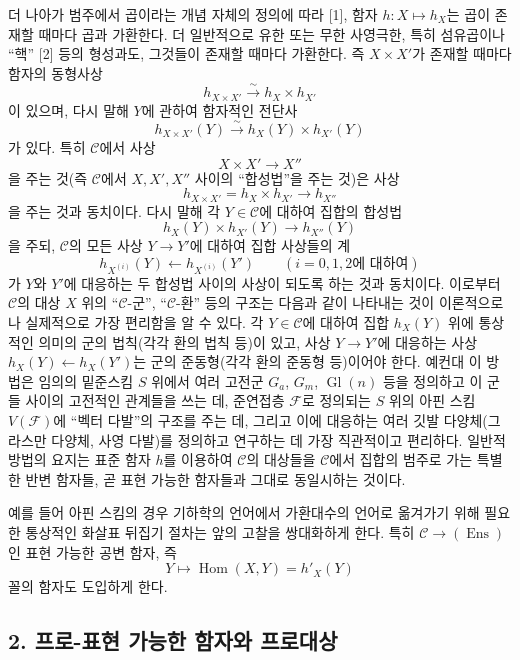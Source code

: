 더 나아가 범주에서 곱이라는 개념 자체의 정의에 따라 [1], 함자
$h:X\longmapsto h_X$는 곱이 존재할 때마다 곱과 가환한다. 더 일반적으로
유한 또는 무한 사영극한, 특히 섬유곱이나 ``핵'' [2] 등의 형성과도,
그것들이 존재할 때마다 가환한다. 즉 $X\times X'$가 존재할 때마다
함자의 동형사상
\[
  h_{X\times X'}\xrightarrow{\sim}h_X\times h_{X'}
\]
이 있으며, 다시 말해 $Y$에 관하여 함자적인 전단사
\[
  h_{X\times X'}(Y)\xrightarrow{\sim}h_X(Y)\times h_{X'}(Y)
\]
가 있다. 특히 $\mathcal C$에서 사상
\[
  X\times X'\longrightarrow X''
\]
을 주는 것(즉 $\mathcal C$에서 $X,X',X''$ 사이의 ``합성법''을 주는 것)은
사상
\[
  h_{X\times X'}=h_X\times h_{X'}\longrightarrow h_{X''}
\]
을 주는 것과 동치이다. 다시 말해 각 $Y\in\mathcal C$에 대하여 집합의
합성법
\[
  h_X(Y)\times h_{X'}(Y)\longrightarrow h_{X''}(Y)
\]
을 주되, $\mathcal C$의 모든 사상 $Y\longrightarrow Y'$에 대하여 집합
사상들의 계
\[
  h_{X^{(i)}}(Y)\longleftarrow h_{X^{(i)}}(Y')
  \qquad(\text{$i=0,1,2$에 대하여})
\]
가 $Y$와 $Y'$에 대응하는 두 합성법 사이의 사상이 되도록 하는 것과
동치이다. 이로부터 $\mathcal C$의 대상 $X$ 위의 ``$\mathcal C$-군'',
``$\mathcal C$-환'' 등의 구조는 다음과 같이 나타내는 것이 이론적으로나
실제적으로 가장 편리함을 알 수 있다. 각 $Y\in\mathcal C$에 대하여 집합
$h_X(Y)$ 위에 통상적인 의미의 군의 법칙(각각 환의 법칙 등)이 있고,
사상 $Y\longrightarrow Y'$에 대응하는 사상
$h_X(Y)\longleftarrow h_X(Y')$는 군의 준동형(각각 환의 준동형 등)이어야
한다. 예컨대 이 방법은 임의의 밑준스킴 $S$ 위에서 여러 고전군
$G_a$, $G_m$, $\operatorname{Gl}(n)$ 등을 정의하고 이 군들 사이의
고전적인 관계들을 쓰는 데, 준연접층 $\mathcal F$로 정의되는 $S$ 위의
아핀 스킴 $V(\mathcal F)$에 ``벡터 다발''의 구조를 주는 데, 그리고
이에 대응하는 여러 깃발 다양체(그라스만 다양체, 사영 다발)를 정의하고
연구하는 데 가장 직관적이고 편리하다. 일반적 방법의 요지는 표준 함자
$h$를 이용하여 $\mathcal C$의 대상들을 $\mathcal C$에서 집합의 범주로
가는 특별한 반변 함자들, 곧 표현 가능한 함자들과 그대로 동일시하는
것이다.


예를 들어 아핀 스킴의 경우 기하학의 언어에서 가환대수의 언어로
옮겨가기 위해 필요한 통상적인 화살표 뒤집기 절차는 앞의 고찰을
쌍대화하게 한다. 특히 $\mathcal C\longrightarrow(\operatorname{Ens})$인
표현 가능한 공변 함자, 즉
\[
  Y\longmapsto\operatorname{Hom}(X,Y)=h'_X(Y)
\]
꼴의 함자도 도입하게 한다.

\subsection*{2. 프로-표현 가능한 함자와 프로대상}

